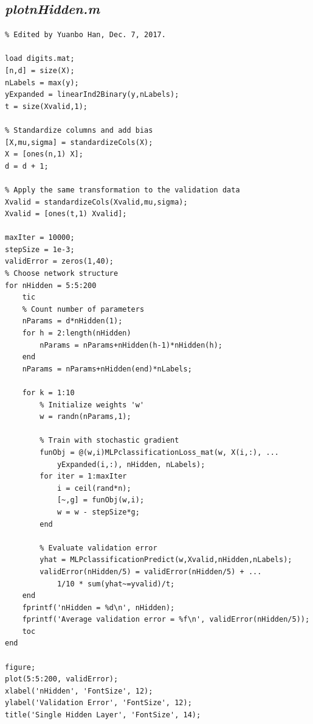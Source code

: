 \documentclass{article}
\begin{document}
\subsection{\emph{plotnHidden.m}}
\begin{lstlisting}
% Edited by Yuanbo Han, Dec. 7, 2017.

load digits.mat;
[n,d] = size(X);
nLabels = max(y);
yExpanded = linearInd2Binary(y,nLabels);
t = size(Xvalid,1);

% Standardize columns and add bias
[X,mu,sigma] = standardizeCols(X);
X = [ones(n,1) X];
d = d + 1;

% Apply the same transformation to the validation data
Xvalid = standardizeCols(Xvalid,mu,sigma);
Xvalid = [ones(t,1) Xvalid];

maxIter = 10000;
stepSize = 1e-3;
validError = zeros(1,40);
% Choose network structure
for nHidden = 5:5:200
    tic
    % Count number of parameters
    nParams = d*nHidden(1);
    for h = 2:length(nHidden)
        nParams = nParams+nHidden(h-1)*nHidden(h);
    end
    nParams = nParams+nHidden(end)*nLabels;
    
    for k = 1:10
        % Initialize weights 'w'
        w = randn(nParams,1);
        
        % Train with stochastic gradient
        funObj = @(w,i)MLPclassificationLoss_mat(w, X(i,:), ...
            yExpanded(i,:), nHidden, nLabels);
        for iter = 1:maxIter
            i = ceil(rand*n);
            [~,g] = funObj(w,i);
            w = w - stepSize*g;
        end
        
        % Evaluate validation error
        yhat = MLPclassificationPredict(w,Xvalid,nHidden,nLabels);
        validError(nHidden/5) = validError(nHidden/5) + ...
            1/10 * sum(yhat~=yvalid)/t;
    end
    fprintf('nHidden = %d\n', nHidden);
    fprintf('Average validation error = %f\n', validError(nHidden/5));
    toc
end

figure;
plot(5:5:200, validError);
xlabel('nHidden', 'FontSize', 12);
ylabel('Validation Error', 'FontSize', 12);
title('Single Hidden Layer', 'FontSize', 14);
\end{lstlisting}
\end{document}
